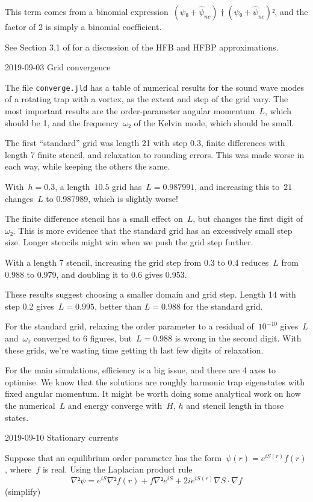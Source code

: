 This term comes from a binomial expression~$(ψ₀+\hat ψ_{nc})†(ψ₀+\hat ψ_{nc})²$, and the factor of 2 is simply a binomial coefficient.

See Section 3.1 of \cite{2009-Griffin-Bose} for a discussion of the HFB and HFBP approximations.

2019-09-03 Grid convergence

The file {\tt converge.jld} has a table of numerical results for the sound wave modes of a rotating trap with a vortex, as the extent and step of the grid vary.  The most important results are the order-parameter angular momentum~$L$, which should be 1, and the frequency~$ω₂$ of the Kelvin mode, which should be small.

The first “standard” grid was length 21 with step 0.3, finite differences with length 7 finite stencil, and relaxation to rounding errors.  This was made worse in each way, while keeping the others the same.

With~$h=0.3$, a length~$10.5$ grid has~$L= 0.987991$, and increasing this to~$21$ changes~$L$ to 0.987989, which is slightly worse!

The finite difference stencil has a small effect on~$L$, but changes the first digit of~$ω₂$.  This is more evidence that the standard grid has an excessively small step size.  Longer stencils might win when we push the grid step further.

With a length 7 stencil, increasing the grid step from 0.3 to 0.4 reduces~$L$ from 0.988 to 0.979, and doubling it to 0.6 gives 0.953.  

These results suggest choosing a smaller domain and grid step.  Length 14 with step 0.2 gives~$L=0.995$, better than $L=0.988$ for the standard grid.

For the standard grid, relaxing the order parameter to a residual of~$10^{-10}$ gives~$L$ and~$ω₂$ converged to 6 figures, but~$L=0.988$ is wrong in the second digit.  With these grids, we're wasting time getting th last few digits of relaxation.

For the main simulations, efficiency is a big issue, and there are 4 axes to optimise.  We know that the solutions are roughly harmonic trap eigenstates with fixed angular momentum.  It might be worth doing some analytical work on how the numerical~$L$ and energy converge with~$H$, $h$ and stencil length in those states.

2019-09-10 Stationary currents

Suppose that an equilibrium order parameter has the form~$ψ(r)=e^{iS(r)}f(r)$, where~$f$ is real.  Using the Laplacian product rule
$$∇²ψ=e^{iS}∇²f(r)+f∇²e^{iS}+2ie^{iS(r)}∇S·∇f$$
(simplify)

